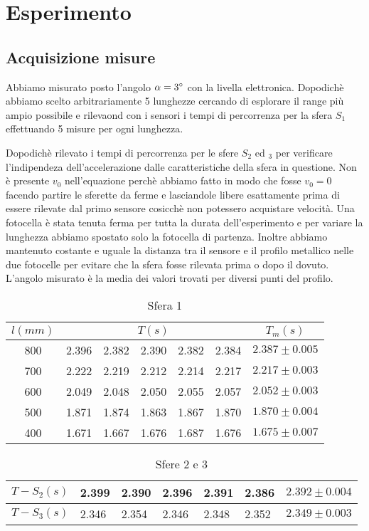 \documentclass[a4paper,10pt]{article}
\begin{document}
\section{Esperimento}
\subsection{Acquisizione misure}
Abbiamo misurato posto l'angolo $\alpha=3\degree$ con la livella elettronica. Dopodichè abbiamo scelto arbitrariamente 5 lunghezze cercando di esplorare il range più ampio possibile e rilevaond con i sensori i tempi di percorrenza per la sfera $S_1$ effettuando 5 misure per ogni lunghezza. 

Dopodichè  rilevato i tempi di percorrenza per le sfere $S_2$ ed $_3$ per verificare l'indipendeza dell'accelerazione dalle caratteristiche della sfera in questione.
Non è presente $v_0$ nell'equazione perchè abbiamo fatto in modo che fosse $v_0=0$ facendo partire le sferette da ferme e lasciandole libere esattamente prima di essere rilevate dal primo sensore cosicchè non potessero acquistare velocità.
Una fotocella è stata tenuta ferma per tutta la durata dell'esperimento e per variare la lunghezza abbiamo spostato solo la fotocella di partenza. Inoltre abbiamo mantenuto costante e uguale la distanza tra
il sensore e il profilo metallico nelle due fotocelle per evitare che la sfera fosse rilevata prima o dopo il dovuto.
 L'angolo misurato è la media dei valori trovati per diversi punti del profilo.
\begin{table}[!htb]
\centering
\caption{Sfera 1}
\label{my-label}
\begin{tabular}{c|ccccc|c}
$l(mm)$ & \multicolumn{5}{c}{$T(s)$}            & $T_m(s)$        \\ \hline
800     & 2.396 & 2.382 & 2.390 & 2.382 & 2.384 & $2.387\pm0.005$ \\
700     & 2.222 & 2.219 & 2.212 & 2.214 & 2.217 & $2.217\pm0.003$ \\
600     & 2.049 & 2.048 & 2.050 & 2.055 & 2.057 & $2.052\pm0.003$ \\
500     & 1.871 & 1.874 & 1.863 & 1.867 & 1.870 & $1.870\pm0.004$ \\
400     & 1.671 & 1.667 & 1.676 & 1.687 & 1.676 & $1.675\pm0.007$
\end{tabular}
\end{table}


\begin{table}[!htb]
\centering
\caption{Sfere 2 e 3}
\label{my-label}
\begin{tabular}{l|llllll}
$T-S_2(s)$ & 2.399 & 2.390 & 2.396 & 2.391 & 2.386 & $2.392\pm0.004$ \\ \hline
$T-S_3(s)$ & 2.346 & 2.354 & 2.346 & 2.348 & 2.352 & $2.349\pm0.003$
\end{tabular}
\end{table}
\end{document}
